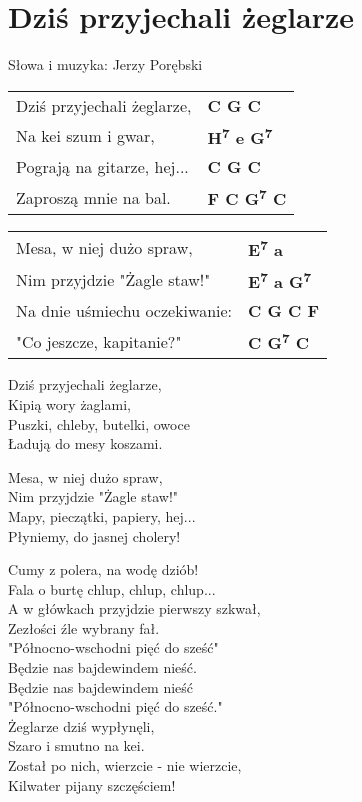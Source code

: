 \section{Dziś przyjechali żeglarze}

Słowa i muzyka: Jerzy Porębski

\vspace{2em}
\begin{tabular}{@{}p{7cm}@{}l@{}}
Dziś przyjechali żeglarze, & \bfseries C G C\\
Na kei szum i gwar, & \bfseries H\textsuperscript{7} e G\textsuperscript{7}\\
Pograją na gitarze, hej... & \bfseries C G C\\
Zaproszą mnie na bal. & \bfseries F C G\textsuperscript{7} C\\
\end{tabular}

\begin{tabular}{@{}p{7cm}@{}l@{}}
Mesa, w niej dużo spraw, & \bfseries E\textsuperscript{7} a\\
Nim przyjdzie "Żagle staw!" & \bfseries E\textsuperscript{7} a G\textsuperscript{7}\\
Na dnie uśmiechu oczekiwanie: & \bfseries C G C F\\
"Co jeszcze, kapitanie?" & \bfseries C G\textsuperscript{7} C\\
\end{tabular}

\vspace{1em}
Dziś przyjechali żeglarze, \\
Kipią wory żaglami, \\
Puszki, chleby, butelki, owoce \\
Ładują do mesy koszami. \\

\begin{multicols}{2}
Mesa, w niej dużo spraw, \\
Nim przyjdzie "Żagle staw!" \\
Mapy, pieczątki, papiery, hej... \\
Płyniemy, do jasnej cholery! \\
\newcolumn

Cumy z polera, na wodę dziób! \\
Fala o burtę chlup, chlup, chlup... \\
A w główkach przyjdzie pierwszy szkwał, \\
Zezłości źle wybrany fał. \\


"Północno-wschodni pięć do sześć" \\
Będzie nas bajdewindem nieść. \\
Będzie nas bajdewindem nieść \\
"Północno-wschodni pięć do sześć." \\

Żeglarze dziś wypłynęli, \\
Szaro i smutno na kei. \\
Został po nich, wierzcie - nie wierzcie, \\
Kilwater pijany szczęściem!
\end{multicols}